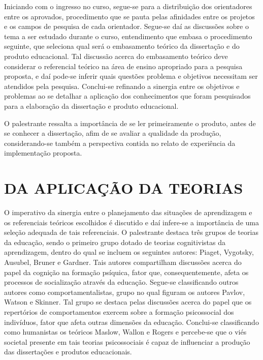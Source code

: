 \documentclass[
   article,       %
   12pt,          %
   oneside,       %
   a4paper,       %
   english,       %
   brazil,           %
   sumario=tradicional
   ]{abntex2}
\begin{document}
Iniciando com o ingresso no curso, segue-se para a distribuição dos orientadores entre os aprovados, procedimento que se pauta pelas afinidades entre os projetos e os campos de pesquisa de cada orientador. Segue-se daí as discussões sobre o tema a ser estudado 
durante o curso, entendimento que embasa o procedimento seguinte, que seleciona qual será o embasamento teórico da dissertação e do produto educacional. Tal discussão acerca do embasamento teórico deve considerar o referencial teórico na área de ensino apropriado para a pesquisa proposta, e daí pode-se inferir quais questões problema e objetivos necessitam ser atendidos pela pesquisa. Conclui-se refinando a sinergia entre os objetivos e problemas ao se detalhar a aplicação dos conhecimentos que foram pesquisados para a elaboração da dissertação e produto educacional.

O palestrante ressalta a importância de se ler primeiramente o produto, antes de se conhecer a dissertação, afim de se avaliar a qualidade da produção, considerando-se também a perspectiva contida no relato de experiência da implementação proposta.


\section{DA APLICAÇÃO DA TEORIAS}

O imperativo da sinergia entre o planejamento das situações de aprendizagem e os referenciais teóricos escolhidos é discutido e daí infere-se a importância de uma seleção adequada de tais referenciais. O palestrante destaca três grupos de teorias da educação, sendo o primeiro grupo dotado de teorias cognitivistas da aprendizagem, dentro do qual se incluem os seguintes autores: Piaget, Vygotsky, Ausubel, Bruner e Gardner. Tais autores compartilham discussões acerca do papel da cognição na formação psíquica, fator que, consequentemente, afeta os processos de socialização através da educação. Segue-se classificando outros autores como comportamentalistas, grupo no qual figuram os autores Pavlov, Watson e Skinner. Tal grupo se destaca pelas discussões acerca do papel que os repertórios de comportamentos exercem sobre a formação psicossocial dos indivíduos, fator que afeta outras dimensões da educação.
Conclui-se classificando como humanistas os teóricos Maslow, Wallon e Rogers e percebe-se que o viés societal presente em tais teorias psicossociais é capaz de influenciar a produção das dissertações e produtos educacionais.
\end{document}
